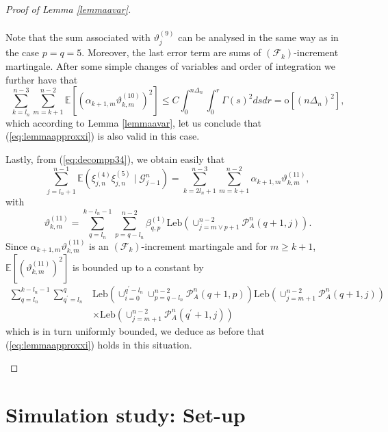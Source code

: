 \documentclass{article}
\theoremstyle{plain}
\theoremstyle{definition}
\theoremstyle{remark}
\newcommand{\Leb}{\ensuremath{\mathrm{Leb}}}
\begin{document}
\begin{appendix}
\begin{proof}[Proof of Lemma \ref{lemmaavar}]
\begin{description}
\begin{align*}
		\end{align*}
		Note that the sum associated with $\vartheta_{j}^{(9)}$ can be analysed
		in the same way as in the case $p=q=5$. Moreover, the last error
		term are sums of $(\mathscr{F}_{k})$-increment martingale. After
		some simple changes of variables and order of integration we further
		have that
		\begin{equation*}
			\sum_{k=l_{n}}^{n-3}\sum_{m=k+1}^{n-2}\mathbb{E}[(\alpha_{k+1,m}\vartheta_{k,m}^{(10)})^{2}]  \leq C\int_{0}^{n\Delta_{n}}\int_{0}^{r}\varGamma(s)^{2}dsdr=\mathrm{o}[(n\Delta_{n})^{2}],
		\end{equation*}
		which according to Lemma \ref{lemmaavar}, let us conclude that (\ref{eq:lemmaapproxxi})
		is also valid in this case.
		\item [{$p=4$}] Lastly, from (\ref{eq:decompp34}), we obtain easily that
		\[
		\sum_{j=l_{n}+1}^{n-1}\mathbb{E}(\xi_{j,n}^{(4)}\xi_{j,n}^{(5)}\mid\mathscr{G}_{j-1}^{n})=\sum_{k=2l_{n}+1}^{n-3}\sum_{m=k+1}^{n-2}\alpha_{k+1,m}\vartheta_{k,m}^{(11)},
		\]
		with 
		\[
		\vartheta_{k,m}^{(11)}=\sum_{q=l_{n}}^{k-l_{n}-1}\sum_{p=q-l_{n}}^{n-2}\beta_{q,p}^{(1)}\Leb(\cup_{j=m\lor p+1}^{n-2}\mathcal{P}_{A}^{n}(q+1,j)).
		\]
		Since $\alpha_{k+1,m}\vartheta_{k,m}^{(11)}$ is an $(\mathscr{F}_{k})$-increment
		martingale and for $m\geq k+1$, $\mathbb{E}[(\vartheta_{k,m}^{(11)})^{2}]$ is bounded up to a constant by
		\begin{align*} \sum_{q=l_{n}}^{k-l_{n}-1}\sum_{q^{\prime}=l_{n}}^{q}&\Leb(\cup_{i=0}^{q^{\prime}-l_{n}}\cup_{p=q-l_{n}}^{n-2}\mathcal{P}_{A}^{n}(q+1,p))\Leb(\cup_{j=m+1}^{n-2}\mathcal{P}_{A}^{n}(q+1,j))\\
			&\times\Leb(\cup_{j=m+1}^{n-2}\mathcal{P}_{A}^{n}(q^{\prime}+1,j))	\end{align*}
		which is in turn uniformly bounded, we deduce as before that (\ref{eq:lemmaapproxxi}) holds in this situation.
	\end{description}
	
\end{proof}

\newpage
\section{Simulation study: Set-up}\label{asec:simsetup}

\end{appendix}
\end{document}
